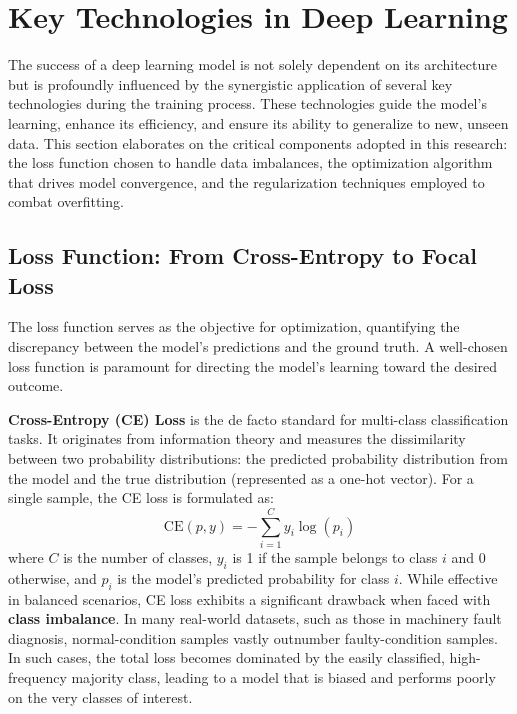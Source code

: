 

\section{Key Technologies in Deep Learning}
\label{sec:key_technologies}

The success of a deep learning model is not solely dependent on its architecture but is profoundly influenced by the synergistic application of several key technologies during the training process. These technologies guide the model's learning, enhance its efficiency, and ensure its ability to generalize to new, unseen data. This section elaborates on the critical components adopted in this research: the loss function chosen to handle data imbalances, the optimization algorithm that drives model convergence, and the regularization techniques employed to combat overfitting.

\subsection{Loss Function: From Cross-Entropy to Focal Loss}
\label{sec:loss_functions}

The loss function serves as the objective for optimization, quantifying the discrepancy between the model's predictions and the ground truth. A well-chosen loss function is paramount for directing the model's learning toward the desired outcome.

\textbf{Cross-Entropy (CE) Loss} is the de facto standard for multi-class classification tasks. It originates from information theory and measures the dissimilarity between two probability distributions: the predicted probability distribution from the model and the true distribution (represented as a one-hot vector). For a single sample, the CE loss is formulated as:
\begin{equation}
\text{CE}(p, y) = - \sum_{i=1}^{C} y_i \log(p_i)
\label{eq:ce_loss}
\end{equation}
where $C$ is the number of classes, $y_i$ is 1 if the sample belongs to class $i$ and 0 otherwise, and $p_i$ is the model's predicted probability for class $i$. While effective in balanced scenarios, CE loss exhibits a significant drawback when faced with \textbf{class imbalance}. In many real-world datasets, such as those in machinery fault diagnosis, normal-condition samples vastly outnumber faulty-condition samples. In such cases, the total loss becomes dominated by the easily classified, high-frequency majority class, leading to a model that is biased and performs poorly on the very classes of interest.

